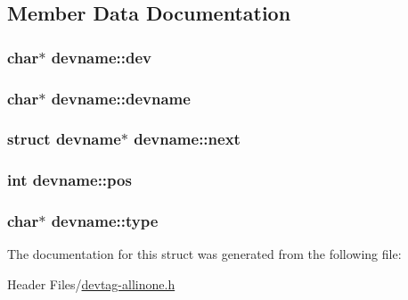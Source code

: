 \subsection{\-Member \-Data \-Documentation}
\hypertarget{structdevname_a0e6ec3e33e7e2011d5a18479f5f2f7af}{
\subsubsection[{dev}]{\setlength{\rightskip}{0pt plus 5cm}char$\ast$ {\bf devname\-::dev}}}\label{structdevname_a0e6ec3e33e7e2011d5a18479f5f2f7af}
\hypertarget{structdevname_ab5ff86fea47142f4d4035470ff433286}{
\subsubsection[{devname}]{\setlength{\rightskip}{0pt plus 5cm}char$\ast$ {\bf devname\-::devname}}}\label{structdevname_ab5ff86fea47142f4d4035470ff433286}
\hypertarget{structdevname_aaf152858dc3b65ebef520ff7983d4012}{
\subsubsection[{next}]{\setlength{\rightskip}{0pt plus 5cm}struct {\bf devname}$\ast$ {\bf devname\-::next}}}\label{structdevname_aaf152858dc3b65ebef520ff7983d4012}
\hypertarget{structdevname_a7e4d4bf0af752d11629ee1d862588e30}{
\subsubsection[{pos}]{\setlength{\rightskip}{0pt plus 5cm}int {\bf devname\-::pos}}}\label{structdevname_a7e4d4bf0af752d11629ee1d862588e30}
\hypertarget{structdevname_a45c535934a7a8190a782b53459cd9d8d}{
\subsubsection[{type}]{\setlength{\rightskip}{0pt plus 5cm}char$\ast$ {\bf devname\-::type}}}\label{structdevname_a45c535934a7a8190a782b53459cd9d8d}


\-The documentation for this struct was generated from the following file\-:\begin{DoxyCompactItemize}
\item 
\-Header Files/\hyperlink{devtag-allinone_8h}{devtag-\/allinone.\-h}\end{DoxyCompactItemize}

